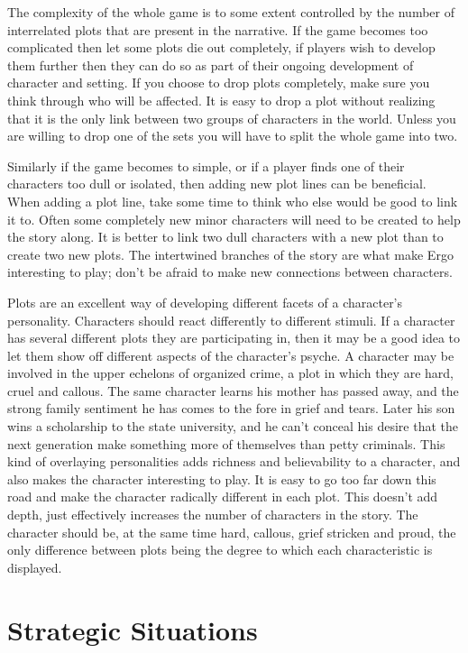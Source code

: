 \documentclass[twoside]{book}
\begin{document}
The complexity of the whole game is to some extent controlled by the
number of interrelated plots that are present in the narrative. If the
game becomes too complicated then let some plots die out completely,
if players wish to develop them further then they can do so as part of
their ongoing development of character and setting. If you choose to
drop plots completely, make sure you think through who will be
affected. It is easy to drop a plot without realizing that it is the
only link between two groups of characters in the world. Unless you
are willing to drop one of the sets you will have to split the whole
game into two.

Similarly if the game becomes to simple, or if a player finds one of
their characters too dull or isolated, then adding new plot lines can
be beneficial. When adding a plot line, take some time to think who
else would be good to link it to. Often some completely new minor
characters will need to be created to help the story along. It is
better to link two dull characters with a new plot than to create two
new plots. The intertwined branches of the story are what make Ergo
interesting to play; don't be afraid to make new connections between
characters.

Plots are an excellent way of developing different facets of a
character's personality. Characters should react differently to
different stimuli. If a character has several different plots they are
participating in, then it may be a good idea to let them show off
different aspects of the character's psyche. A character may be
involved in the upper echelons of organized crime, a plot in which
they are hard, cruel and callous. The same character learns his mother
has passed away, and the strong family sentiment he has comes to the
fore in grief and tears. Later his son wins a scholarship to the state
university, and he can't conceal his desire that the next generation
make something more of themselves than petty criminals. This kind of
overlaying personalities adds richness and believability to a
character, and also makes the character interesting to play. It is
easy to go too far down this road and make the character radically
different in each plot. This doesn't add depth, just effectively
increases the number of characters in the story. The character should
be, at the same time hard, callous, grief stricken and proud, the only
difference between plots being the degree to which each characteristic
is displayed.

\section{Strategic Situations}
\end{document}
